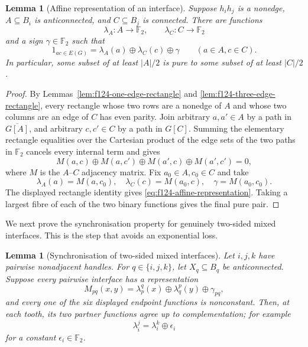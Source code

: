 \documentclass[11pt]{article}
\numberwithin{equation}{section}
\theoremstyle{plain}
\newtheorem{lemma}[theorem]{Lemma}
\theoremstyle{definition}
\begin{document}
\begin{lemma}[Affine representation of an interface]
\label{lem:f124-affine-cut}
Suppose $h_ih_j$ is a nonedge, $A\subseteq B_i$ is anticonnected, and
$C\subseteq B_j$ is connected.  There are functions
\[
 \lambda_A:A\longrightarrow\mathbb F_2,
 \qquad
 \lambda_C:C\longrightarrow\mathbb F_2
\]
and a sign $\gamma\in\mathbb F_2$ such that
\begin{equation}
  1_{ac\in E(G)}=\lambda_A(a)\oplus\lambda_C(c)\oplus\gamma
       \qquad(a\in A,c\in C).
 \label{eq:f124-affine-representation}
\end{equation}
In particular, some subset of at least $|A|/2$ is pure to some subset of
at least $|C|/2$.
\end{lemma}

\begin{proof}
By Lemmas~\ref{lem:f124-one-edge-rectangle} and
\ref{lem:f124-three-edge-rectangle}, every rectangle whose two rows are
a nonedge of $A$ and whose two columns are an edge of $C$ has even parity.
Join arbitrary $a,a'\in A$ by a path in $\overline{G[A]}$, and arbitrary
$c,c'\in C$ by a path in $G[C]$.  Summing the elementary rectangle
equalities over the Cartesian product of the edge sets of the two paths
in $\mathbb F_2$ cancels every internal term and gives
\[
 M(a,c)\oplus M(a,c')\oplus M(a',c)\oplus M(a',c')=0,
\]
where $M$ is the $A$--$C$ adjacency matrix.  Fix $a_0\in A,c_0\in C$
and take
\[
 \lambda_A(a)=M(a,c_0),\quad
 \lambda_C(c)=M(a_0,c),\quad
 \gamma=M(a_0,c_0).
\]
The displayed rectangle identity gives
\eqref{eq:f124-affine-representation}.  Taking a largest fibre of
each of the two binary functions gives the final pure pair.
\end{proof}

We next prove the synchronisation property for genuinely two-sided
mixed interfaces.  This is the step that avoids an exponential loss.

\begin{lemma}[Synchronisation of two-sided mixed interfaces]
\label{lem:f124-triple-sync}
Let $i,j,k$ have pairwise nonadjacent handles.  For $q\in\{i,j,k\}$,
let $X_q\subseteq B_q$ be anticonnected.  Suppose every
pairwise interface has a representation
\begin{equation}
 M_{pq}(x,y)=\lambda_p^q(x)\oplus\lambda_q^p(y)
                         \oplus\gamma_{pq},
 \label{eq:f124-triple-affine}
\end{equation}
and every one of the six displayed endpoint functions is nonconstant.
Then, at each tooth, its two partner functions agree up to complementation;
for example
\[
                         \lambda_i^j=\lambda_i^k\oplus\epsilon_i
\]
for a constant $\epsilon_i\in\mathbb F_2$.
\end{lemma}
\end{document}
